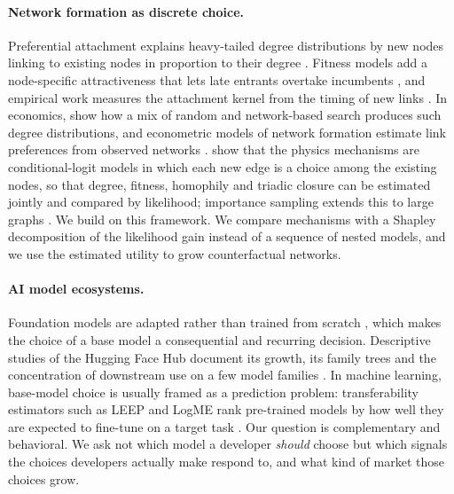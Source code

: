 \paragraph{Network formation as discrete choice.}
Preferential attachment explains heavy-tailed degree distributions by new nodes linking to existing nodes in
proportion to their degree \citep{price1976general,barabasi1999emergence}. Fitness models add a node-specific
attractiveness that lets late entrants overtake incumbents \citep{bianconi2001competition,wang2013quantifying}, and
empirical work measures the attachment kernel from the timing of new links
\citep{newman2001clustering,jeong2003measuring}. In economics, \citet{jackson2007meeting} show how a mix of random
and network-based search produces such degree distributions, and econometric models of network formation estimate
link preferences from observed networks \citep{graham2017econometric,depaula2020econometric}.
\citet{overgoor2019choosing} show that the physics mechanisms are conditional-logit models in which each new edge is a
choice among the existing nodes, so that degree, fitness, homophily and triadic closure can be estimated jointly and
compared by likelihood; importance sampling extends this to large graphs \citep{overgoor2020scaling}. We build on this
framework. We compare mechanisms with a Shapley decomposition of the likelihood gain instead of a sequence of nested
models, and we use the estimated utility to grow counterfactual networks.

\paragraph{AI model ecosystems.}
Foundation models are adapted rather than trained from scratch \citep{bommasani2021opportunities}, which makes the
choice of a base model a consequential and recurring decision. Descriptive studies of the Hugging Face Hub document
its growth, its family trees and the concentration of downstream use on a few model families
\citep{osborne2024ai,laufer2025anatomy}. In machine learning, base-model choice is usually framed as a prediction
problem: transferability estimators such as LEEP and LogME rank pre-trained models by how well they are expected to
fine-tune on a target task \citep{nguyen2020leep,you2021logme}. Our question is complementary and behavioral. We ask
not which model a developer \emph{should} choose but which signals the choices developers actually make respond to,
and what kind of market those choices grow.
